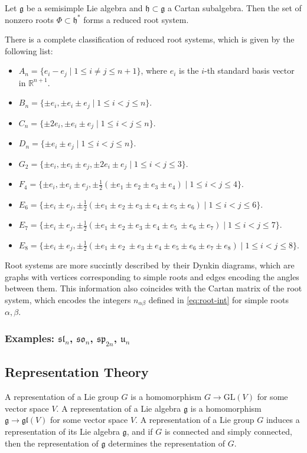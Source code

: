 \documentclass[12pt]{article}
\begin{document}
\begin{theorem}
    Let $\mathfrak g$ be a semisimple Lie algebra and $\mathfrak h \subset \mathfrak g$ a Cartan subalgebra. Then the set of nonzero roots $\Phi \subset \mathfrak h^*$ forms a reduced root system.
\end{theorem}
There is a complete classification of reduced root systems, which is given by the following list:
\begin{itemize}
    \item $A_n = \{ e_i - e_j \mid 1 \le i \neq j \le n+1 \}$, where $e_i$ is the $i$-th standard basis vector in $\mathbb R^{n+1}$.
    \item $B_n = \{ \pm e_i, \pm e_i \pm e_j \mid 1 \le i < j \le n \}$.
    \item $C_n = \{ \pm 2e_i, \pm e_i \pm e_j \mid 1 \le i < j \le n \}$.
    \item   $D_n = \{ \pm e_i \pm e_j \mid 1 \le i < j \le n \}$.
    \item $G_2 = \{ \pm e_i, \pm e_i \pm e_j, \pm 2e_i \pm e_j \mid 1 \le i < j \le 3 \}$.
    \item $F_4 = \{ \pm e_i, \pm e_i \pm e_j, \pm \frac{1}{2}(\pm e_1 \pm e_2 \pm e_3 \pm e_4) \mid 1 \le i < j \le 4 \}$.
    \item $E_6 = \{ \pm e_i \pm e_j, \pm \frac{1}{2}(\pm e_1 \pm e_2 \pm e_3 \pm e_4 \pm e_5 \pm e_6) \mid 1 \le i < j \le 6 \}$.
    \item $E_7 = \{ \pm e_i \pm e_j, \pm \frac{1}{2}(\pm e_1 \pm e_2 \pm e_3 \pm e_4 \pm e_5 \  \pm e_6 \pm e_7) \mid 1 \le i < j \le 7 \}$.
    \item $E_8 = \{ \pm e_i \pm e_j, \pm \frac{1}{2}(\pm e_1 \pm e_2 \  \pm e_3 \pm e_4 \pm e_5 \pm e_6 \pm e_7 \pm e_8) \mid 1 \le i < j \le 8 \}$.
\end{itemize}

Root systems are more succintly described by their Dynkin diagrams, which are graphs with vertices corresponding to simple roots and edges encoding the angles between them. This information also coincides with the Cartan matrix of the root system, which encodes the integers $n_{\alpha\beta}$ defined in \eqref{eq:root-int} for simple roots $\alpha,\beta$.
\subsubsection{Examples: $\mathfrak{sl}_n$, $\mathfrak{so}_n$, $\mathfrak{sp}_{2n}$, $\mathfrak{u}_n$}

\subsection{Representation Theory}
A representation of a Lie group $G$ is a homomorphism $G\to \mathrm{GL}(V)$ for some vector space $V$. A representation of a Lie algebra $\mathfrak g$ is a homomorphism $\mathfrak g \to \mathfrak{gl}(V)$ for some vector space $V$. A representation of a Lie group $G$ induces a representation of its Lie algebra $\mathfrak g$, and if $G$ is connected and simply connected, then the representation of $\mathfrak g$ determines the representation of $G$.
\end{document}

